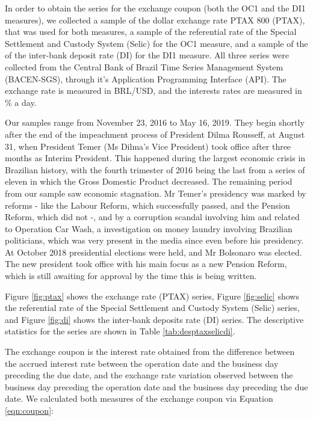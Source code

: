 \documentclass[cic,tc, english]{iiufrgs}
\begin{document}
    In order to obtain the series for the exchange coupon (both the OC1 and the DI1 measures), we collected a sample of the dollar exchange rate PTAX 800 (PTAX), that was used for both measures, a sample of the referential rate of the Special Settlement and Custody System (Selic) for the OC1 measure, and a sample of the of the inter-bank deposit rate (DI) for the DI1 measure. All three series were collected from the Central Bank of Brazil Time Series Management System (BACEN-SGS), through it's Application Programming Interface (API). The exchange rate is measured in BRL/USD, and the interests rates are measured in \% a day.
    
    Our samples range from November 23, 2016 to May 16, 2019. They begin shortly after the end of the impeachment process of President Dilma Rousseff, at August 31, when President Temer (Ms Dilma's Vice President) took office after three months as Interim President. This happened during the largest economic crisis in Brazilian history, with the fourth trimester of 2016 being the last from a series of eleven in which the Gross Domestic Product decreased. The remaining period from our sample saw economic stagnation. Mr Temer's presidency was marked by reforms - like the Labour Reform, which successfully passed, and the Pension Reform, which did not -, and by a corruption scandal involving him and related to Operation Car Wash, a investigation on money laundry involving Brazilian politicians, which was very present in the media since even before his presidency. At October 2018 presidential elections were held, and Mr Bolsonaro was elected. The new president took office with his main focus as a new Pension Reform, which is still awaiting for approval by the time this is being written.
    

    Figure \ref{fig:ptax} shows the exchange rate (PTAX) series, Figure \ref{fig:selic} shows the referential rate of the Special Settlement and Custody System (Selic) series, and Figure \ref{fig:di} shows the inter-bank deposits rate (DI) series. The descriptive statistics for the series are shown in Table \ref{tab:desptaxselicdi}.

    

    

    

    

    The exchange coupon is the interest rate obtained from the difference between the accrued interest rate between the operation date and the business day preceding the due date, and the exchange rate variation observed between the business day preceding the operation date and the business day preceding the due date. We calculated both measures of the exchange coupon via Equation \ref{eqn:coupon}:
\end{document}
